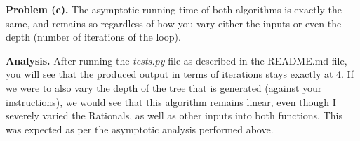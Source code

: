 \documentclass{article}
\begin{document}
\hfill

\textbf{Problem (c).} The asymptotic running time of both algorithms is exactly the same, and remains so regardless of how you vary either the inputs or even the depth (number of iterations of the loop).

\hfill

\textbf{Analysis.} After running the \emph{tests.py} file as described in the README.md file, you will see that the produced output in terms of iterations stays exactly at 4. If we were to also vary the depth of the tree that is generated (against your instructions), we would see that this algorithm remains linear, even though I severely varied the Rationals, as well as other inputs into both functions. This was expected as per the asymptotic analysis performed above. 

\newpage
 

\end{document}

